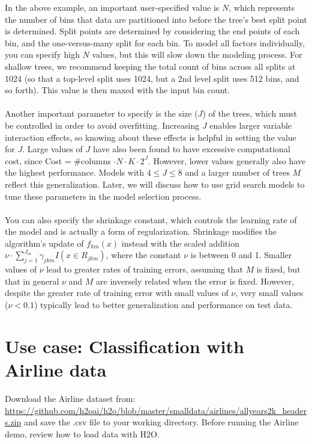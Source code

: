In the above example, an important user-specified value is $N$, which represents the number of bins that data are
partitioned into before the tree's best split point is determined. Split points are determined by considering the
end points of each bin, and the one-versus-many split for each bin. To model all factors individually, you can
specify high $N$ values, but this will slow down the modeling process. For shallow trees, we recommend keeping the
total count of bins across all splits at 1024 (so that a top-level split uses 1024, but a 2nd level split uses 512
bins, and so forth). This value is then maxed with the input bin count.
\\
\\
Another important parameter to specify is the size ($J$) of the trees, which must be controlled in order to avoid
overfitting. Increasing $J$ enables larger variable interaction effects, so knowing about these effects is helpful
in setting the value for $J$. Large values of $J$ have also been found to have excessive computational cost,
since Cost = \#columns $\cdot N \cdot K \cdot 2^{J}$. However, lower values generally also have the highest
performance. Models with $4 \leq J \leq 8$ and a larger number of trees $M$ reflect this generalization.
Later, we will discuss how to use grid search models to tune these parameters in the model selection process.
\\
\\
You can also specify the shrinkage constant, which controls the learning rate of the model and is actually a
form of regularization. Shrinkage modifies the algorithm's update of $f_{km}(x)$ instead with the scaled
addition $\nu \cdot \sum_{j=1}^{J_m} \gamma_{jkm} I(x \in R_{jkm})$, where the constant $\nu$ is between 0 and 1.
Smaller values of $\nu$ lead to greater rates of training errors, assuming that $M$ is fixed, but that in general
$\nu$ and $M$ are inversely related when the error is  fixed.
However, despite the greater rate of training error with small values of $\nu$, very small values ($\nu < 0.1$)
typically lead to better generalization and performance on test data.

\section{Use case: Classification with Airline data}

Download the Airline dataset from: {\url{https://github.com/h2oai/h2o/blob/master/smalldata/airlines/allyears2k_headers.zip}} and save the .csv file to your working directory. Before running the Airline demo, review how to load data with H2O.


